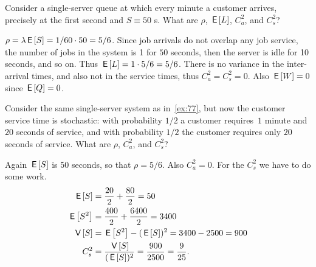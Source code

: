 \documentclass[stochastic-or.tex]{subfiles}
\begin{document}
\begin{exercise}\label{ex:77}
 Consider  a single-server queue at which every minute a customer arrives, precisely at the first second and $S\equiv 50$ s.
 What are $\rho$, $\,\mathsf{E}\left[L\right]$, $C_a^2$, and $C_s^2$?
\begin{solution}
 $\rho = \lambda \,\mathsf{E}\left[S\right] = 1/60 \cdot 50 = 5/6$.
 Since job arrivals do not overlap any job service, the number of jobs in the system is 1 for $50$ seconds, then the server is idle for 10 seconds, and so on.
 Thus $\,\mathsf{E}\left[L\right] = 1\cdot5/6 = 5/6$.
 There is no variance in the inter-arrival times, and also not in the service times, thus $C_a^2 = C_s^2 = 0$.
 Also $\,\mathsf{E}\left[W\right]=0$ since $\,\mathsf{E}\left[Q\right]=0$.
\end{solution}
\end{exercise}

\begin{exercise}\label{ex:76}
 Consider the same single-server system as in~\cref{ex:77}, but now the customer service time is stochastic: with probability $1/2$ a customer requires~$1$ minute and $20$ seconds of service, and with probability $1/2$ the customer requires only $20$ seconds of service.
 What are $\rho$, $C_a^2$, and $C_s^2$?
\begin{solution}
 Again $\,\mathsf{E}\left[S\right]$ is 50 seconds, so that $\rho = 5/6$. Also
 $C_a^2=0$. For the $C_s^2$ we have to do some work.
 \begin{equation*}
 \begin{split}
 \,\mathsf{E}\left[S\right] &= \frac{20}2 + \frac{80}2 = 50 \\
 \,\mathsf{E}\left[S^2\right] &= \frac{400}2 + \frac{6400} 2 = 3400 \\
 \,\mathsf{V}\left[S\right] &= \,\mathsf{E}\left[S^2\right] - (\,\mathsf{E}\left[S\right])^2 = 3400 - 2500 = 900 \\
 C_s^2 &= \frac{\,\mathsf{V}\left[S\right]}{(\,\mathsf{E}\left[S\right])^2} = \frac{900}{2500}=\frac{9}{25}.
 \end{split}
 \end{equation*}
\end{solution}
\end{exercise}
\end{document}

